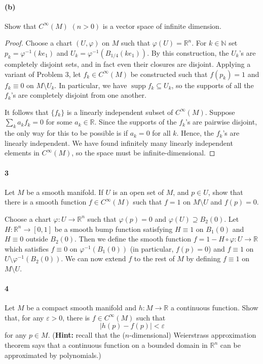 \documentclass[12pt]{article}
\newlength{\myparskip}
\newenvironment{fullbox}{\begin{lrbox}{\savefullbox}\begin{minipage}{\dimexpr\textwidth-2\fboxsep\relax}\setlength{\parskip}{\myparskip}}{\end{minipage}\end{lrbox}\framebox[\textwidth]{\usebox{\savefullbox}}}
\newenvironment{pbox}[1][]{\begin{fullbox}\def\temp{#1}\ifx\temp\empty\else\paragraph{#1}\phantom{}\fi}{\end{fullbox}}
\theoremstyle{definition}
\newcommand{\N}{\mathbb{N}}
\newcommand{\R}{\mathbb{R}}
\newcommand{\eps}{\varepsilon}
\renewcommand{\phi}{\varphi}
\newcommand{\<}{\langle}
\renewcommand{\>}{\rangle}
\newcommand{\seq}{\subseteq}
\DeclareMathOperator{\supp}{supp}
\begin{document}
\begin{pbox}[(b)]
    Show that $C^\infty(M)$ $(n>0)$ is a vector space of infinite dimension.
\end{pbox}

\begin{proof}
    Choose a chart $(U, \phi)$ on $M$ such that $\phi(U) = \R^n$.
    For $k \in \N$ set $p_k = \phi^{-1}(ke_1)$ and $U_k = \phi^{-1}(B_{1/4}(ke_1))$.
    By this construction, the $U_k$'s are completely disjoint sets, and in fact even their closures are disjoint.
    Applying a variant of Problem 3, let $f_k \in C^\infty(M)$ be constructed such that $f(p_k) = 1$ and $f_k \equiv 0$ on $M \setminus U_k$.
    In particular, we have $\supp f_k \seq U_k$, so the supports of all the $f_k$'s are completely disjoint from one another.

    It follows that $\{f_k\}$ is a linearly independent subset of $C^\infty(M)$.
    Suppose $\sum_k a_kf_k = 0$ for some $a_k \in \R$.
    Since the supports of the $f_k$'s are pairwise disjoint, the only way for this to be possible is if $a_k = 0$ for all $k$.
    Hence, the $f_k$'s are linearly independent.
    We have found infinitely many linearly independent elements in $C^\infty(M)$, so the space must be infinite-dimensional.
\end{proof}





\newpage
\begin{pbox}[3]
    Let $M$ be a smooth manifold. If $U$ is an open set of $M$, and $p\in U$, show that there is a smooth function $f\in C^\infty(M)$ such that $f=1$ on $M\setminus U$ and $f(p)=0$.
\end{pbox}

Choose a chart $\phi : U \to \R^n$ such that $\phi(p) = 0$ and $\phi(U) \supseteq B_2(0)$.
Let $H : \R^n \to [0, 1]$ be a smooth bump function satisfying $H \equiv 1$ on $B_1(0)$ and $H \equiv 0$ outside $B_2(0)$.
Then we define the smooth function $f = 1 - H \circ \phi : U \to \R$ which satisfies $f \equiv 0$ on $\phi^{-1}(B_1(0))$ (in particular, $f(p) = 0$) and $f \equiv 1$ on $U \setminus \phi^{-1}(B_2(0))$.
We can now extend $f$ to the rest of $M$ by defining $f \equiv 1$ on $M \setminus U$.


\newpage
\begin{pbox}[4]
    Let $M$ be a compact smooth manifold and $h: M\to \R$ a continuous function. Show that, for any $\eps>0$, there is $f\in C^\infty(M)$ such that
    \[
        |h(p)- f(p)| < \eps
    \]
    for any $p\in M$. (\textbf{Hint:} recall that the ($n$-dimensional) Weierstrass approximation theorem says that a continuous function on a bounded domain in $\R^n$ can be approximated by polynomials.)
\end{pbox}
\end{document}

